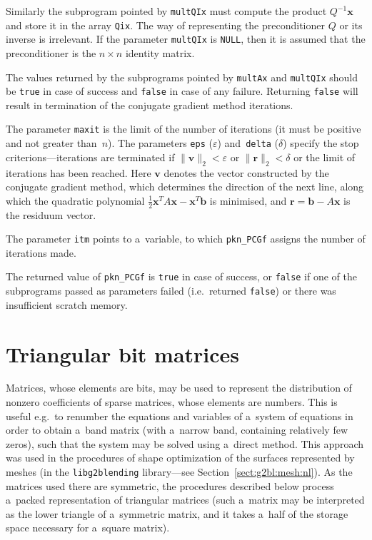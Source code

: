 Similarly the subprogram pointed by \texttt{multQIx} must compute the product
$Q^{-1}\bm{x}$ and store it in the array \texttt{Qix}. The way of
representing the preconditioner $Q$ or its inverse is irrelevant.
If the parameter \texttt{multQIx} is \texttt{NULL}, then it is assumed that
the preconditioner is the $n\times n$ identity matrix.

The values returned by the subprograms pointed by \texttt{multAx} and
\texttt{multQIx} should be \texttt{true} in case of success and
\texttt{false} in case of any failure. Returning \texttt{false} will result
in termination of the conjugate gradient method iterations.

The parameter \texttt{maxit} is the limit of the number of iterations (it
must be positive and not greater than~$n$). The parameters \texttt{eps}
($\varepsilon$) and~\texttt{delta} ($\delta$) specify the stop
criterions---iterations are terminated if $\|\bm{v}\|_2<\varepsilon$ or
$\|\bm{r}\|_2<\delta$ or the limit of iterations has been reached. Here
$\bm{v}$ denotes the vector constructed by the conjugate gradient method,
which determines the direction of the next line, along which the quadratic
polynomial $\frac{1}{2}\bm{x}^TA\bm{x}-\bm{x}^T\bm{b}$ is minimised, and
$\bm{r}=\bm{b}-A\bm{x}$ is the residuum vector.

The parameter \texttt{itm} points to a~variable, to which
\texttt{pkn\_PCGf} assigns the number of iterations made.

The returned value of \texttt{pkn\_PCGf} is \texttt{true} in case of
success, or \texttt{false} if one of the subprograms passed as parameters
failed (i.e.\ returned \texttt{false}) or there was insufficient scratch
memory.


\newpage
\section{Triangular bit matrices}

Matrices, whose elements are bits, may be used to represent the distribution
of nonzero coefficients of sparse matrices, whose elements are numbers. This
is useful e.g.\ to renumber the equations and variables of a~system of
equations in order to obtain a~band matrix (with a~narrow band, containing
relatively few zeros), such that the system may be solved using a~direct
method. This approach was used in the procedures of shape optimization of the
surfaces represented by meshes (in the \texttt{libg2blending} library---see
Section~\ref{sect:g2bl:mesh:nl}). As the matrices used there are symmetric,
the procedures described below process a~packed representation of triangular
matrices (such a~matrix may be interpreted as the lower triangle of
a~symmetric matrix, and it takes a~half of the storage space necessary for
a~square matrix).

